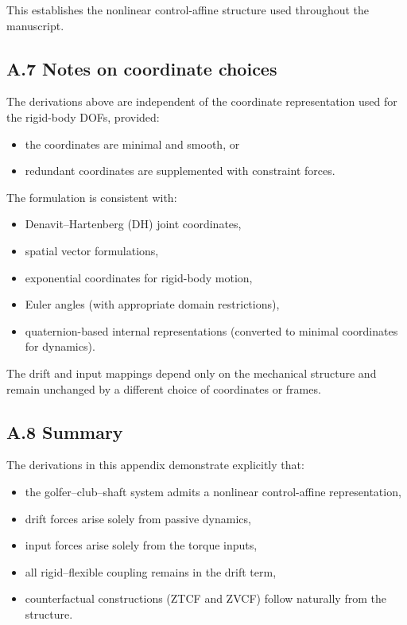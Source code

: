 \documentclass[12pt]{article}
\begin{document}
This establishes the nonlinear control-affine structure used throughout the manuscript.

\subsection{A.7 \quad Notes on coordinate choices}

The derivations above are independent of the coordinate representation used for the rigid-body DOFs, provided:
\begin{itemize}
  \item the coordinates are minimal and smooth, or
  \item redundant coordinates are supplemented with constraint forces.
\end{itemize}

The formulation is consistent with:
\begin{itemize}
  \item Denavit--Hartenberg (DH) joint coordinates,
  \item spatial vector formulations,
  \item exponential coordinates for rigid-body motion,
  \item Euler angles (with appropriate domain restrictions),
  \item quaternion-based internal representations (converted to minimal coordinates for dynamics).
\end{itemize}

The drift and input mappings depend only on the mechanical structure and remain unchanged by a different choice of coordinates or frames.

\subsection{A.8 \quad Summary}

The derivations in this appendix demonstrate explicitly that:
\begin{itemize}
  \item the golfer--club--shaft system admits a nonlinear control-affine representation,
  \item drift forces arise solely from passive dynamics,
  \item input forces arise solely from the torque inputs,
  \item all rigid–flexible coupling remains in the drift term,
  \item counterfactual constructions (ZTCF and ZVCF) follow naturally from the structure.
\end{itemize}
\end{document}
